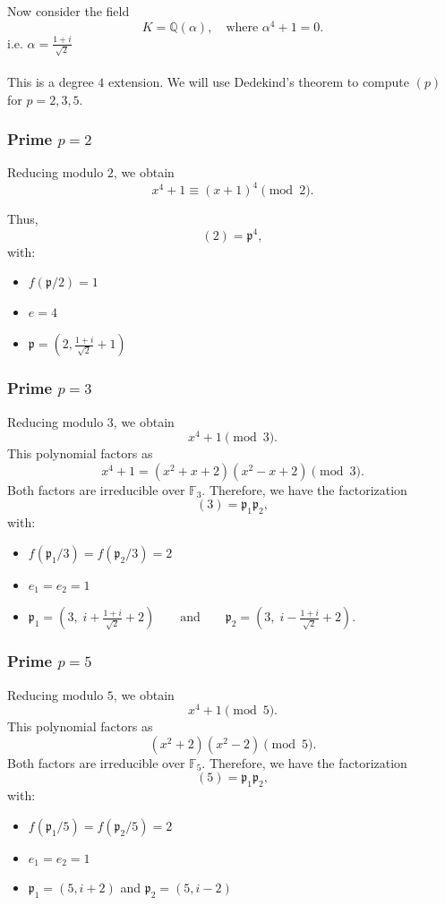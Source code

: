 Now consider the field \[ K = \mathbb{Q}(\alpha), \quad \text{where } \alpha^4 + 1 = 0. \]
i.e. $\alpha = \frac{1+i}{\sqrt2}$
\\\\This is a degree $4$ extension. We will use Dedekind’s theorem to compute $(p)$ for $p = 2, 3, 5$.
\subsubsection*{Prime $p = 2$}

Reducing modulo $2$, we obtain
\[
x^4+1\equiv (x+1)^4 \pmod{2}.
\]

Thus,
\[
(2)=\mathfrak p^4,
\]
with:
\begin{itemize}
\item $f(\mathfrak p/2)=1$
\item $e=4$
\item $\mathfrak p=\left(2,\frac{1+i}{\sqrt2}+1\right)$
\end{itemize}
\subsubsection*{Prime $p = 3$}

Reducing modulo $3$, we obtain
\[
x^4+1 \pmod{3}.
\]
This polynomial factors as
\[
x^4+1=(x^2+x+2)(x^2-x+2)\pmod{3}.
\]
Both factors are irreducible over $\mathbb{F}_3$. Therefore, we have the factorization
\[
(3)=\mathfrak p_1\mathfrak p_2,
\]
with:
\begin{itemize}
\item $f(\mathfrak p_1/3)=f(\mathfrak p_2/3)=2$
\item $e_1=e_2=1$
\item $\mathfrak p_1=\left(3,\; i+\frac{1+i}{\sqrt2}+2\right)
\qquad\text{and}\qquad
\mathfrak p_2=\left(3,\; i-\frac{1+i}{\sqrt2}+2\right).$
\end{itemize}
\subsubsection*{Prime $p = 5$}
Reducing modulo $5$, we obtain
\[
x^4+1 \pmod{5}.
\]
This polynomial factors as
\[
(x^2+2)(x^2-2)\pmod{5}.
\]
Both factors are irreducible over $\mathbb{F}_5$. Therefore, we have the factorization
\[
(5)=\mathfrak p_1\mathfrak p_2,
\]
with:
\begin{itemize}
\item $f(\mathfrak p_1/5)=f(\mathfrak p_2/5)=2$
\item $e_1=e_2=1$
\item $\mathfrak p_1=(5,i+2)$ and $\mathfrak p_2=(5,i-2)$
\end{itemize}

